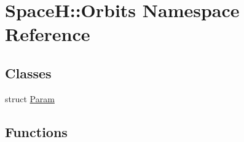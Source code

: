\hypertarget{namespace_space_h_1_1_orbits}{}\section{SpaceH\+:\+:Orbits Namespace Reference}
\label{namespace_space_h_1_1_orbits}
\subsection*{Classes}
\begin{DoxyCompactItemize}
\item 
struct \mbox{\hyperlink{struct_space_h_1_1_orbits_1_1_param}{Param}}
\end{DoxyCompactItemize}
\subsection*{Functions}
